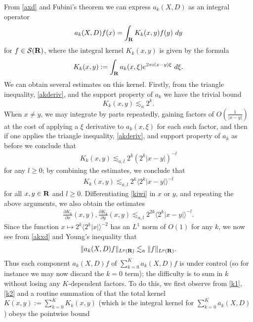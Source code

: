 \documentclass[11pt]{article}
\theoremstyle{definition}
\theoremstyle{remark}
\begin{document}
From \eqref{axd} and Fubini’s theorem we can express \({a_k(X,D)}\) as an integral operator 
\begin{align}\label{akxd}
  a_k(X,D) f(x) = \int_{\bf R} K_k(x,y) f(y)\ dy 
\end{align}
 for \({f \in \mathcal{S}({\bf R})}\), where the integral kernel \({K_k(x,y)}\) is given by the formula 
\begin{align}\label{kiwi}
  K_k(x,y) := \int_{\bf R} a_k(x,\xi) e^{2\pi i (x-y) \xi}\ d\xi. 
\end{align}
 We can obtain several estimates on this kernel. Firstly, from the triangle inequality, \eqref{akderiv}, and the support property of \({a_k}\) we have the trivial bound 
\[\displaystyle  K_k(x,y) \lesssim_a 2^k.\]
 When \({x \neq y}\), we may integrate by parts repeatedly, gaining factors of \({O(\frac{1}{|x-y|})}\) at the cost of applying a \({\xi}\) derivative to \({a_k(x,\xi)}\) for each such factor, and then if one applies the triangle inequality, \eqref{akderiv}, and support property of \({a_k}\) as before we conclude that 
\begin{align}\label{k1}
  K_k(x,y) \lesssim_{a,l} 2^k (2^k |x-y|)^{-l} 
\end{align}
 for any \({l \geq 0}\); by combining the estimates, we conclude that 
\begin{align}\label{k2}
  K_k(x,y) \lesssim_{a,l} 2^k \langle 2^k |x-y|\rangle^{-l} 
\end{align}
 for all \({x,y \in {\bf R}}\) and \({l \geq 0}\). Differentiating \eqref{kiwi} in \({x}\) or \({y}\), and repeating the above arguments, we also obtain the estimates 
\begin{align}\label{k3}
  \frac{\partial K_k}{\partial x}(x,y), \frac{\partial K_k}{\partial y}(x,y) \lesssim_{a,l} 2^{2k} \langle 2^k |x-y|\rangle^{-l}. 
\end{align}
 Since the function \({x \mapsto 2^k \langle 2^k |x| \rangle^{-2}}\) has an \({L^1}\) norm of \({O(1)}\) for any \({k}\), we now see from \eqref{akxd} and Young’s inequality that 
\begin{align}\label{akxd-bound}
  \| a_k(X,D) f\|_{L^p({\bf R})} \lesssim_a \|f\|_{L^p({\bf R})}. 
\end{align}
 Thus each component \({a_k(X,D) f}\) of \({\sum_{k=0}^K a_k(X,D) f}\) is under control (so for instance we may now discard the \({k=0}\) term); the difficulty is to sum in \({k}\) without losing any \({K}\)-dependent factors. To do this, we first observe from \eqref{k1}, \eqref{k2} and a routine summation of that the total kernel \({K(x,y) := \sum_{k=0}^K K_k(x,y)}\) (which is the integral kernel for \({\sum_{k=0}^K a_k(X,D)}\)) obeys the pointwise bound 
\end{document}
